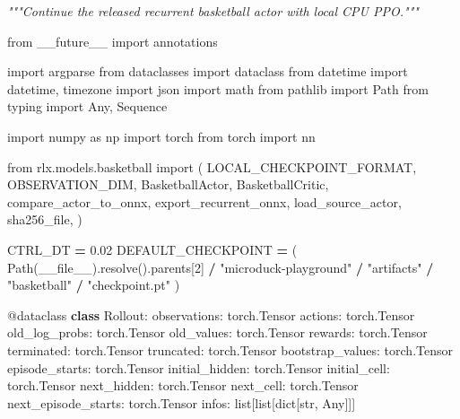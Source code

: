 \documentclass[
  chinese,
  11pt,
  letterpaper,
]{article}
\newenvironment{Shaded}{\begin{snugshade}}{\end{snugshade}}
\newcommand{\AttributeTok}[1]{\textcolor[rgb]{0.13,0.29,0.53}{#1}}
\newcommand{\BuiltInTok}[1]{#1}
\newcommand{\CommentTok}[1]{\textcolor[rgb]{0.56,0.35,0.01}{\textit{#1}}}
\newcommand{\DecValTok}[1]{\textcolor[rgb]{0.00,0.00,0.81}{#1}}
\newcommand{\FloatTok}[1]{\textcolor[rgb]{0.00,0.00,0.81}{#1}}
\newcommand{\ImportTok}[1]{#1}
\newcommand{\KeywordTok}[1]{\textcolor[rgb]{0.13,0.29,0.53}{\textbf{#1}}}
\newcommand{\NormalTok}[1]{#1}
\newcommand{\OperatorTok}[1]{\textcolor[rgb]{0.81,0.36,0.00}{\textbf{#1}}}
\newcommand{\StringTok}[1]{\textcolor[rgb]{0.31,0.60,0.02}{#1}}
\newcommand{\VariableTok}[1]{\textcolor[rgb]{0.00,0.00,0.00}{#1}}
\renewenvironment{Shaded}{\par\smallskip}{\par\smallskip}
\begin{document}
\begin{Shaded}
\begin{Highlighting}[]
\CommentTok{"""Continue the released recurrent basketball actor with local CPU PPO."""}

\ImportTok{from}\NormalTok{ \_\_future\_\_ }\ImportTok{import}\NormalTok{ annotations}

\ImportTok{import}\NormalTok{ argparse}
\ImportTok{from}\NormalTok{ dataclasses }\ImportTok{import}\NormalTok{ dataclass}
\ImportTok{from}\NormalTok{ datetime }\ImportTok{import}\NormalTok{ datetime, timezone}
\ImportTok{import}\NormalTok{ json}
\ImportTok{import}\NormalTok{ math}
\ImportTok{from}\NormalTok{ pathlib }\ImportTok{import}\NormalTok{ Path}
\ImportTok{from}\NormalTok{ typing }\ImportTok{import}\NormalTok{ Any, Sequence}

\ImportTok{import}\NormalTok{ numpy }\ImportTok{as}\NormalTok{ np}
\ImportTok{import}\NormalTok{ torch}
\ImportTok{from}\NormalTok{ torch }\ImportTok{import}\NormalTok{ nn}

\ImportTok{from}\NormalTok{ rlx.models.basketball }\ImportTok{import}\NormalTok{ (}
\NormalTok{    LOCAL\_CHECKPOINT\_FORMAT,}
\NormalTok{    OBSERVATION\_DIM,}
\NormalTok{    BasketballActor,}
\NormalTok{    BasketballCritic,}
\NormalTok{    compare\_actor\_to\_onnx,}
\NormalTok{    export\_recurrent\_onnx,}
\NormalTok{    load\_source\_actor,}
\NormalTok{    sha256\_file,}
\NormalTok{)}

\NormalTok{CTRL\_DT }\OperatorTok{=} \FloatTok{0.02}
\NormalTok{DEFAULT\_CHECKPOINT }\OperatorTok{=}\NormalTok{ (}
\NormalTok{    Path(}\VariableTok{\_\_file\_\_}\NormalTok{).resolve().parents[}\DecValTok{2}\NormalTok{]}
    \OperatorTok{/} \StringTok{"microduck{-}playground"}
    \OperatorTok{/} \StringTok{"artifacts"}
    \OperatorTok{/} \StringTok{"basketball"}
    \OperatorTok{/} \StringTok{"checkpoint.pt"}
\NormalTok{)}


\AttributeTok{@dataclass}
\KeywordTok{class}\NormalTok{ Rollout:}
\NormalTok{    observations: torch.Tensor}
\NormalTok{    actions: torch.Tensor}
\NormalTok{    old\_log\_probs: torch.Tensor}
\NormalTok{    old\_values: torch.Tensor}
\NormalTok{    rewards: torch.Tensor}
\NormalTok{    terminated: torch.Tensor}
\NormalTok{    truncated: torch.Tensor}
\NormalTok{    bootstrap\_values: torch.Tensor}
\NormalTok{    episode\_starts: torch.Tensor}
\NormalTok{    initial\_hidden: torch.Tensor}
\NormalTok{    initial\_cell: torch.Tensor}
\NormalTok{    next\_hidden: torch.Tensor}
\NormalTok{    next\_cell: torch.Tensor}
\NormalTok{    next\_episode\_starts: torch.Tensor}
\NormalTok{    infos: }\BuiltInTok{list}\NormalTok{[}\BuiltInTok{list}\NormalTok{[}\BuiltInTok{dict}\NormalTok{[}\BuiltInTok{str}\NormalTok{, Any]]]}



\end{Highlighting}
\end{Shaded}
\end{document}
